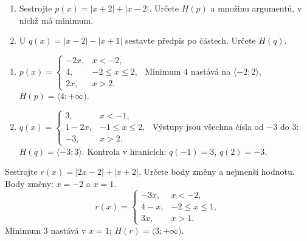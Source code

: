 \documentclass[11pt,a4paper]{article}
\begin{document}
\begin{zadaniReseniBox}[title={Samostatná práce 1}]
\begin{enumerate}[label=\alph*)]
\item Sestrojte $p(x)=|x+2|+|x-2|$. Určete $H(p)$ a množinu argumentů, v nichž má minimum.
\item U $q(x)=|x-2|-|x+1|$ sestavte předpis po částech. Určete $H(q)$.
\end{enumerate}
\tcblower
\begin{enumerate}[label=\alph*)]
\item $p(x)=\begin{cases}-2x,&x<-2,\\4,&-2\le x\le2,\\2x,&x>2.\end{cases}$ Minimum $4$ nastává na $\langle-2;2\rangle$, $H(p)=\langle4;+\infty)$.
\item $q(x)=\begin{cases}3,&x<-1,\\1-2x,&-1\le x\le2,\\-3,&x>2.\end{cases}$ Výstupy jsou všechna čísla od $-3$ do $3$: $H(q)=\langle-3;3\rangle$. Kontrola v hranicích: $q(-1)=3$, $q(2)=-3$.
\end{enumerate}
\end{zadaniReseniBox}
\begin{zadaniReseniBox}[title={Rozšíření 1}]
Sestrojte $r(x)=|2x-2|+|x+2|$. Určete body změny a nejmenší hodnotu.
\tcblower
Body změny: $x=-2$ a $x=1$.
\[
r(x)=\begin{cases}-3x,&x<-2,\\4-x,&-2\le x\le1,\\3x,&x>1.\end{cases}
\]
Minimum $3$ nastává v $x=1$; $H(r)=\langle3;+\infty)$.
\end{zadaniReseniBox}
\end{document}
